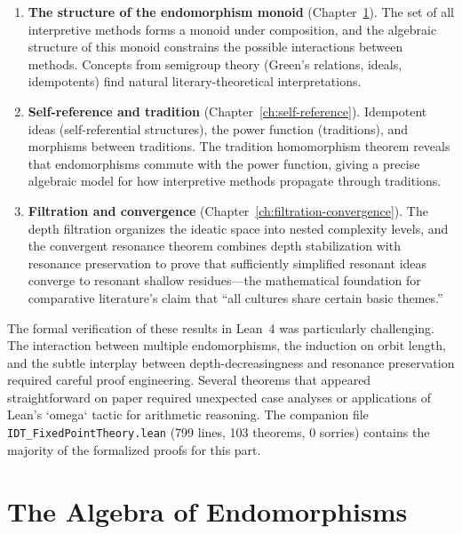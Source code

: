 \documentclass[11pt,openany]{book}
\theoremstyle{definition}
\theoremstyle{plain}
\theoremstyle{remark}
\begin{document}
\begin{enumerate}
\item \textbf{The structure of the endomorphism monoid} (Chapter~\ref{ch:endo-algebra}). The set of all interpretive methods forms a monoid under composition, and the algebraic structure of this monoid constrains the possible interactions between methods. Concepts from semigroup theory (Green's relations, ideals, idempotents) find natural literary-theoretical interpretations.

\item \textbf{Self-reference and tradition} (Chapter~\ref{ch:self-reference}). Idempotent ideas (self-referential structures), the power function (traditions), and morphisms between traditions. The tradition homomorphism theorem reveals that endomorphisms commute with the power function, giving a precise algebraic model for how interpretive methods propagate through traditions.

\item \textbf{Filtration and convergence} (Chapter~\ref{ch:filtration-convergence}). The depth filtration organizes the ideatic space into nested complexity levels, and the convergent resonance theorem combines depth stabilization with resonance preservation to prove that sufficiently simplified resonant ideas converge to resonant shallow residues---the mathematical foundation for comparative literature's claim that ``all cultures share certain basic themes.''
\end{enumerate}

The formal verification of these results in Lean~4 was particularly challenging. The interaction between multiple endomorphisms, the induction on orbit length, and the subtle interplay between depth-decreasingness and resonance preservation required careful proof engineering. Several theorems that appeared straightforward on paper required unexpected case analyses or applications of Lean's `omega` tactic for arithmetic reasoning. The companion file \texttt{IDT\_FixedPointTheory.lean} (799 lines, 103 theorems, 0 sorries) contains the majority of the formalized proofs for this part.

\chapter{The Algebra of Endomorphisms}
\label{ch:endo-algebra}
\end{document}
